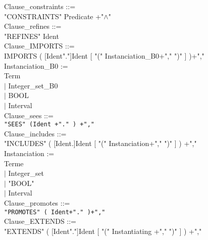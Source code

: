 \documentclass[12pt,a4paper,draft]{article}
\begin{document}
\footnotesize{
\begin{sloppypar}

\noindent Clause\_constraints ::= \\
\hspace*{0.20in}  "CONSTRAINTS" Predicate +"$\land$"\\
Clause\_refines ::=\\ 
\hspace*{0.20in}  "REFINES" Ident \\
Clause\_IMPORTS ::= \\
\hspace*{0.20in} IMPORTS ( [Ident"."]Ident  [ "(" Instanciation\_B0+"," ")" ] )+","\\
Instanciation\_B0 := \\
\hspace*{0.20in}    Term\\
\hspace*{0.20in} $|$  Integer\_set\_B0\\
\hspace*{0.20in} $|$  BOOL\\
\hspace*{0.20in} $|$  Interval\\
Clause\_sees ::= \\
\hspace*{0.20in}  \texttt{"SEES" (Ident +"." ) +","}\\
Clause\_includes ::= \\
\hspace*{0.20in}  "INCLUDES" ( [Ident.]Ident  [ "(" Instanciation+","  ")" ] ) +","\\
Instanciation := \\
\hspace*{0.20in}    Terme\\
\hspace*{0.20in} $|$  Integer\_set\\
\hspace*{0.20in} $|$ "BOOL"\\
\hspace*{0.20in} $|$  Interval \\
Clause\_promotes ::= \\
\hspace*{0.20in}   \texttt{"PROMOTES" ( Ident+"." )+","}\\
\noindent Clause\_EXTENDS ::= \\
\hspace*{0.20in}  "EXTENDS" ( [Ident"."]Ident  [ "(" Instantiating +","  ")" ] ) +","\\

\end{sloppypar}}
\end{document}
